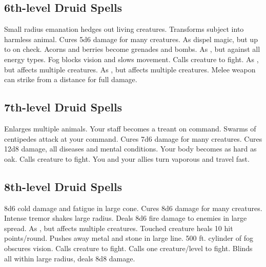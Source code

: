 \subsection{6th-level Druid Spells}
\begin{spelllist}
   Small radius emanation hedges out living creatures.
   Transforms subject into harmless animal.
   Cures 5d6 damage for many creatures.
   As dispel magic, but up to  on check.
   Acorns and berries become grenades and bombs.
   As , but against all energy types.
   Fog blocks vision and slows movement.
   Calls creature to fight.
   As , but affects multiple creatures.
   As , but affects multiple creatures.
   Melee weapon can strike from a distance for full damage.
\end{spelllist}

\subsection{7th-level Druid Spells}
\begin{spelllist}
   Enlarges multiple animals.
   Your staff becomes a treant on command.
   Swarms of centipedes attack at your command.
   Cures 7d6 damage for many creatures.
   Cures 12d8 damage, all diseases and mental conditions.
   Your body becomes as hard as oak. 
   Calls creature to fight.
   You and your allies turn vaporous and travel fast.
\end{spelllist}

\subsection{8th-level Druid Spells}
\begin{spelllist}
   8d6 cold damage and fatigue in large cone.
   Cures 8d6 damage for many creatures.
   Intense tremor shakes large radius.
   Deals 8d6 fire damage to enemies in large spread.
   As , but affects multiple creatures.
   Touched creature heals 10 hit points/round.
   Pushes away metal and stone in large line.
   500 ft. cylinder of fog obscures vision.
   Calls creature to fight.
   Calls one creature/level to fight.
   Blinds all within large radius, deals 8d8 damage.
\end{spelllist}

